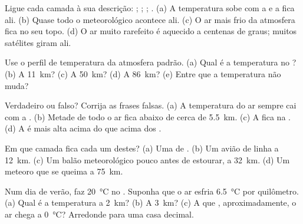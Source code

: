 \begin{exercise}[$\star$]\label{exo:g8:the-atmosphere:1}
Ligue cada camada à sua descrição: ; ; ;
. (a) A temperatura sobe com a  e a 
fica ali. (b) Quase todo o  meteorológico acontece ali. (c) O ar mais
frio da atmosfera fica no seu topo. (d) O ar muito rarefeito é aquecido a
centenas de graus; muitos satélites giram ali.
\end{exercise}

\begin{exercise}[$\star$]\label{exo:g8:the-atmosphere:2}
Use o perfil de temperatura da atmosfera padrão. (a) Qual é a temperatura
no ? (b) A \qty{11}{km}? (c) A \qty{50}{km}? (d) A
\qty{86}{km}? (e) Entre que  a temperatura não muda?
\end{exercise}

\begin{exercise}[$\star$]\label{exo:g8:the-atmosphere:3}
Verdadeiro ou falso? Corrija as frases falsas. (a) A temperatura do ar
sempre cai com a . (b) Metade de todo o ar fica abaixo de cerca
de \qty{5.5}{km}. (c) A  fica na . (d) A
 é mais alta acima do  que acima dos .
\end{exercise}

\begin{exercise}[$\star$]\label{exo:g8:the-atmosphere:4}
Em que camada fica cada um destes? (a) Uma  de . (b) Um avião
de linha a \qty{12}{km}. (c) Um balão meteorológico pouco antes de
estourar, a \qty{32}{km}. (d) Um meteoro que se queima a \qty{75}{km}.
\end{exercise}

\begin{exercise}[$\star\star$]\label{exo:g8:the-atmosphere:5}
Num dia de verão, faz \qty{20}{\degreeCelsius} no . Suponha
que o ar esfria \qty{6.5}{\degreeCelsius} por quilômetro. (a) Qual é a
temperatura a \qty{2}{km}? (b) A \qty{3}{km}? (c) A que ,
aproximadamente, o ar chega a \qty{0}{\degreeCelsius}? Arredonde para uma
casa decimal.
\end{exercise}

